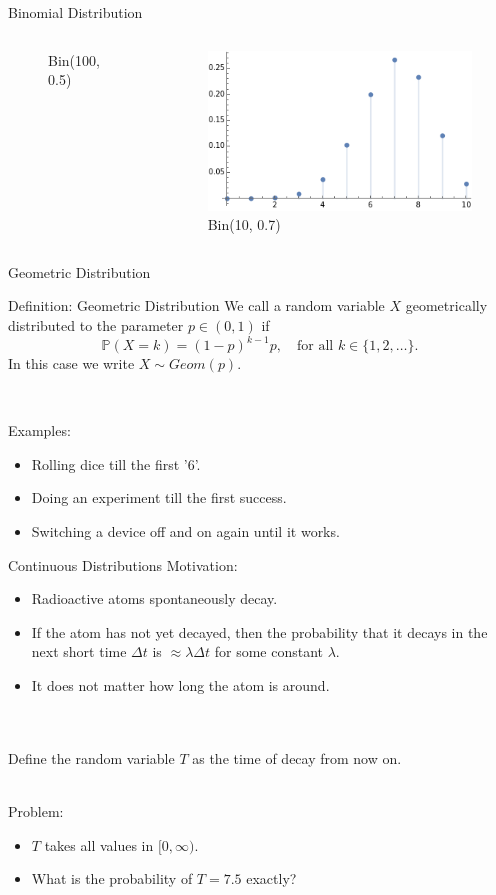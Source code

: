 \documentclass[11pt,pdf,ngerman,UKenglish]{beamer}%
\newcommand{\IP}{\mathbb{P}}
\newcommand{\1}{\mathbb{1}}
\theoremstyle{thm}
\theoremstyle{def}
\begin{document}
\begin{frame}{Binomial Distribution}
\begin{columns}[c]
\begin{figure}
    	\caption{Bin(100, 0.5)}
        \end{figure}
\vspace*{-9mm}
        \begin{figure}
            \includegraphics[scale=0.4]{BinomialPDF_10_07.png}
    	\caption{Bin(10, 0.7)}
        \end{figure}
\end{columns}
\end{frame}


\begin{frame}{Geometric Distribution}
\begin{block}{Definition: Geometric Distribution}
We call a random variable $X$ geometrically distributed to the parameter $p \in (0,1)$ if
$$ \IP(X=k)= (1-p)^{k-1}p, \quad \text{for all } k \in \{ 1,2,\ldots \}.$$
In this case we write $X \sim Geom(p)$.
\end{block}
\

Examples:
\begin{itemize}
\item Rolling dice till the first '6'.
\item Doing an experiment till the first success.
\item Switching a device off and on again until it works.
\end{itemize}
\end{frame}


\begin{frame}{Continuous Distributions}
Motivation:
\begin{itemize}
\item Radioactive atoms spontaneously decay.
\item If the atom has not yet decayed, then the probability that it decays in the next short time $\Delta t$ is $\approx \lambda \Delta t$ for some constant $\lambda$.
\item It does not matter how long the atom is around.
\end{itemize}
\ \\ \ \\
Define the random variable $T$ as the time of decay from now on.

\ \\
\pause
Problem:
\begin{itemize}
\item $T$ takes all values in $[0,\infty)$.
\item What is the probability of $T=7.5$ exactly?
\end{itemize}
\end{frame}
\end{document}
